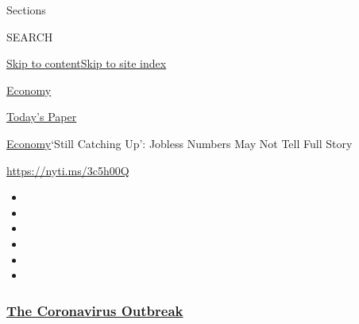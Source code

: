 Sections

SEARCH

\protect\hyperlink{site-content}{Skip to
content}\protect\hyperlink{site-index}{Skip to site index}

\href{https://www.nytimes3xbfgragh.onion/section/business/economy}{Economy}

\href{https://myaccount.nytimes3xbfgragh.onion/auth/login?response_type=cookie\&client_id=vi}{}

\href{https://www.nytimes3xbfgragh.onion/section/todayspaper}{Today's
Paper}

\href{/section/business/economy}{Economy}\textbar{}`Still Catching Up':
Jobless Numbers May Not Tell Full Story

\url{https://nyti.ms/3c5h00Q}

\begin{itemize}
\item
\item
\item
\item
\item
\item
\end{itemize}

\hypertarget{the-coronavirus-outbreak}{%
\subsubsection{\texorpdfstring{\href{https://www.nytimes3xbfgragh.onion/news-event/coronavirus?name=styln-coronavirus-markets\&region=TOP_BANNER\&block=storyline_menu_recirc\&action=click\&pgtype=Article\&impression_id=b8528d20-f52e-11ea-bd61-6d19986efa33\&variant=undefined}{The
Coronavirus
Outbreak}}{The Coronavirus Outbreak}}\label{the-coronavirus-outbreak}}

